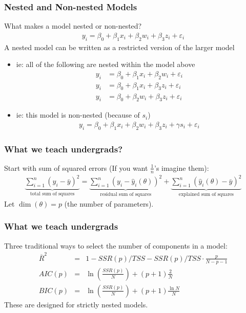 \documentclass[xcolor=pdftex,dvipsnames,table,mathserif,aspectratio=169]{beamer}
\begin{document}
\begin{frame}
\frametitle{Nested and Non-nested Models}
What makes a model \alert{nested} or \alert{non-nested}?
\begin{align*}
y_i = \beta_0 + \beta_1 x_i + \beta_2 w_i + \beta_3 z_i + \varepsilon_i 
\end{align*}
A nested model can be written as a restricted version of the larger model
\begin{itemize}
\item ie: all of the following are nested within the model above
\begin{align*}
y_i &= \beta_0 + \beta_1 x_i + \beta_2 w_i + \varepsilon_i  \\
y_i &= \beta_0 + \beta_1 x_i + \beta_3 z_i + \varepsilon_i  \\
y_i &= \beta_0 + \beta_2 w_i + \beta_3 z_i + \varepsilon_i  
\end{align*}
\item ie: this model is non-nested (because of $s_i$)
\begin{align*}
y_i = \beta_0 + \beta_1 x_i + \beta_2 w_i + \beta_3 z_i + \gamma s_i +  \varepsilon_i 
\end{align*}
\end{itemize}
\end{frame}


\begin{frame}
\frametitle{What we teach undergrads?}
Start with sum of squared errors (If you want $\frac{1}{n}$'s imagine them):
\begin{align*}
\underbrace{\sum_{i=1}^{n}\left(y_{i}-\bar{y}\right)^{2}}_{\text{total sum of squares}}
=\underbrace{\sum_{i=1}^{n}\left(y_{i}-\hat{y}_{i}(\theta)\right)^{2}}_{\text{residual sum of squares}}
+\underbrace{\sum_{i=1}^{n}\left(\hat{y}_{i}(\theta)-\bar{y}\right)^{2}}_{\text{explained sum of squares}}
\end{align*}
Let $\dim(\theta)=p$ (the number of parameters).


\end{frame}




\begin{frame}
\frametitle{What we teach undergrads}
Three traditional ways to select the number of components in a model:\\
\begin{eqnarray*}
\overline{R}^2  &=& 1-SSR(p)/TSS - SSR(p)/TSS \cdot \frac{p}{N-p-1} \\
AIC(p) &=& \ln\left(\frac{SSR(p)}{N}\right) + (p+1)\frac{2}{N}\\
BIC(p) &=& \ln \left(\frac{SSR(p)}{N} \right) + (p+1)\frac{\ln N}{N}
\end{eqnarray*}
These are designed for strictly \alert{nested} models.
\end{frame}
\end{document}
